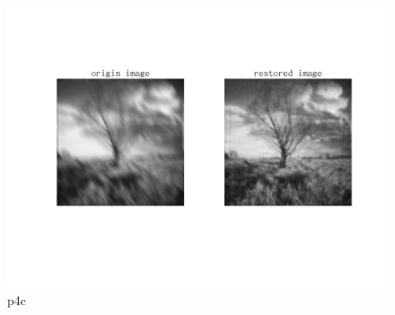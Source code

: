 \begin{figure}[htbp]
    \centering
	\includegraphics[width=\textwidth]{../images/p4/p4c.png}
    \caption{p4c}
    \label{fig:p4c}
\end{figure}




